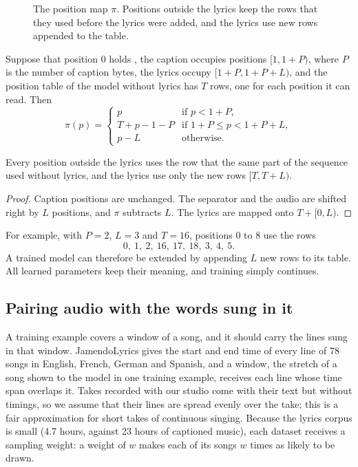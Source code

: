 \begin{figure}[htbp]
\centering
\resizebox{\linewidth}{!}{}
\caption{The position map $\pi$. Positions outside the lyrics keep the rows
that they used before the lyrics were added, and the lyrics use new rows
appended to the table.}
\label{fig:lyrics}
\end{figure}

\begin{definition}
Suppose that position 0 holds , the caption occupies positions
$[1, 1{+}P)$, where $P$ is the number of caption bytes, the lyrics occupy
$[1{+}P, 1{+}P{+}L)$, and the position table of the model without lyrics has
$T$ rows, one for each position it can read. Then
\[
\pi(p) =
\begin{cases}
p & \text{if } p < 1 + P, \\
T + p - 1 - P & \text{if } 1 + P \le p < 1 + P + L, \\
p - L & \text{otherwise}.
\end{cases}
\]
\end{definition}

\begin{lemma}
Every position outside the lyrics uses the row that the same part of the
sequence used without lyrics, and the lyrics use only the new rows
$[T, T + L)$.
\end{lemma}
\begin{proof}
Caption positions are unchanged. The separator and the audio are shifted right
by $L$ positions, and $\pi$ subtracts $L$. The lyrics are mapped onto
$T + [0, L)$.
\end{proof}

For example, with $P = 2$, $L = 3$ and $T = 16$, positions $0$ to $8$ use the rows
\[
0,\ 1,\ 2,\ 16,\ 17,\ 18,\ 3,\ 4,\ 5.
\] A trained model can therefore be extended by
appending $L$ new rows to its table. All learned parameters keep their
meaning, and training simply continues.

\subsection{Pairing audio with the words sung in it}

A training example covers a window of a song, and it should carry the lines
sung in that window. JamendoLyrics \cite{durand2023lyrics} gives the start and
end time of every line of 78 songs in English, French, German and Spanish, and
a window, the stretch of a song shown to the model in one training example,
receives each line whose time span overlaps it. Takes recorded with our studio
come with their text but without timings, so we assume that their lines are
spread evenly over the take; this is a fair approximation for short takes of
continuous singing. Because the lyrics corpus is small (4.7 hours, against 23
hours of captioned music), each dataset receives a sampling weight: a weight of
$w$ makes each of its songs $w$ times as likely to be drawn.

